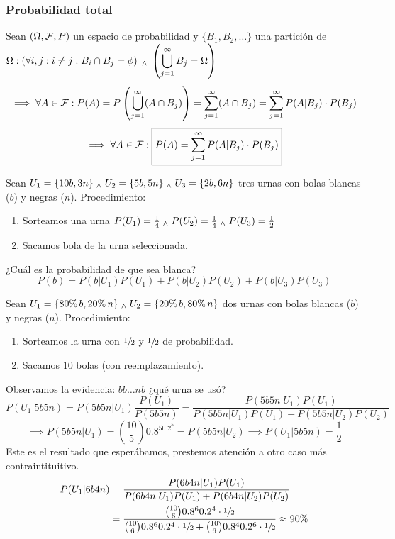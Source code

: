 \subsubsection{Probabilidad total}
\begin{prop}
	Sean $(\Omega, \mathcal{F}, P)$ un espacio de probabilidad y $\{B_1, B_2, \dots\}$ una partición de $\displaystyle \Omega : \left(\forall i, j :  i\ne j : B_i\cap B_j = \phi\right) \; _{\wedge} \; \left(\bigcup_{j=1}^\infty B_j=\Omega\right)$
	\[\implies \forall A \in \mathcal{F} : P(A)=P\left(\bigcup_{j=1}^\infty(A\cap B_j)\right)=\sum_{j=1}^\infty(A\cap B_j)=\sum_{j=1}^\infty P(A|B_j)\cdot P(B_j)\]
	\[\implies \forall A \in \mathcal{F} : \boxed{P(A) = \sum_{j=1}^\infty P(A|B_j)\cdot P(B_j)}\]
	\hfill \qedsymbol
\end{prop}
\begin{ejem}
	Sean $U_1=\{10b, 3n\} \; _{\wedge} \; U_2=\{5b, 5n\} \; _{\wedge} \; U_3=\{2b, 6n\}$ tres urnas con bolas blancas ($b$) y negras ($n$). Procedimiento:
	\begin{enumerate}[topsep=1pt, itemsep=1pt,parsep=3pt]
		\item Sorteamos una urna $P(U_1)=\frac{1}{4} \; _{\wedge} \; P(U_2)=\frac{1}{4} \; _{\wedge} \; P(U_3) =
			      \frac{1}{2}$
		\item Sacamos bola de la urna seleccionada.
	\end{enumerate}
	¿Cuál es la probabilidad de que sea blanca?
	\[P(b)=P(b|U_1)P(U_1)+P(b|U_2)P(U_2)+P(b|U_3)P(U_3)\]
\end{ejem}

\begin{ejem}
	Sean $U_1=\{80\%\,b, 20\%\,n\} \; _{\wedge} \; U_2=\{20\%\,b, 80\%\,n\}$ dos urnas con bolas blancas ($b$) y negras ($n$). Procedimiento:
	\begin{enumerate}[topsep=1pt, itemsep=1pt,parsep=3pt]
		\item Sorteamos la urna con $\sfrac{1}{2}$ y $\sfrac{1}{2}$ de probabilidad.
		\item Sacamos $10$ bolas (con reemplazamiento).
	\end{enumerate}
	Observamos la evidencia: $bb\dots nb$ ¿qué urna se usó?
	\[P(U_1|5b5n)=P(5b5n|U_1)\frac{P(U_1)}{P(5b5n)}=\frac{P(5b5n|U_1)P(U_1)}{P(5b5n|U_1)P(U_1)+P(5b5n|U_2)P(U_2)}\]
	\[\implies P(5b5n|U_1)=\binom{10}{5}0.8^50.2^5=P(5b5n|U_2) \implies P(U_1|5b5n)=\frac{1}{2}\]
	Este es el resultado que esperábamos, prestemos atención a otro caso más
	contraintituitivo.
	\[\begin{aligned}
			P(U_1|6b4n) & = \frac{P(6b4n|U_1)P(U_1)}{P(6b4n|U_1)P(U_1)+P(6b4n|U_2)P(U_2)}                                                                                   \\
			            & = \frac{\binom{10}{6}0.8^60.2^4\cdot\sfrac{1}{2}}{\binom{10}{6}0.8^60.2^4\cdot\sfrac{1}{2} + \binom{10}{6}0.8^40.2^6\cdot\sfrac{1}{2}}\approx90\%
		\end{aligned}\]
\end{ejem}
\begin{wrapfigure}{r}{4.3cm}
	
\end{wrapfigure}

